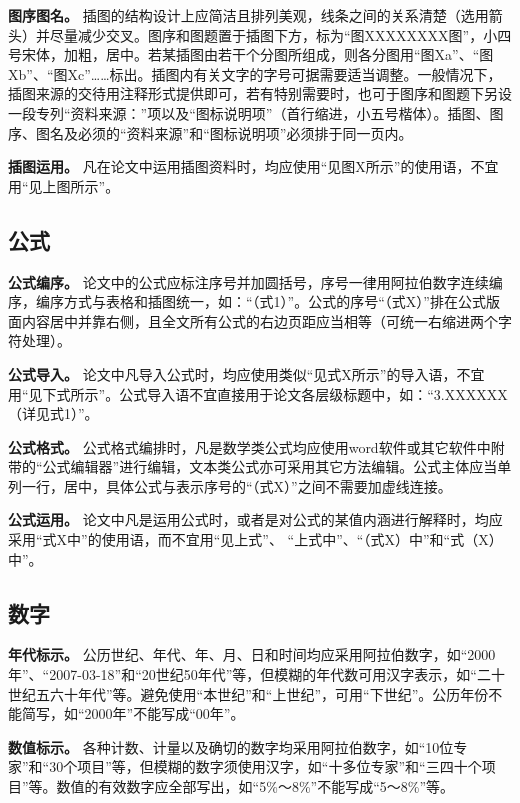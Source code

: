 \documentclass[doublesided]{Style/ucasthesis}%
\begin{document}
\textbf{图序图名。} 插图的结构设计上应简洁且排列美观，线条之间的关系清楚（选用箭头）并尽量减少交叉。图序和图题置于插图下方，标为``图XXXXXXXX图''，小四号宋体，加粗，居中。若某插图由若干个分图所组成，则各分图用``图Xa''、``图Xb''、``图Xc''\ldots{}\ldots{}标出。插图内有关文字的字号可据需要适当调整。一般情况下，插图来源的交待用注释形式提供即可，若有特别需要时，也可于图序和图题下另设一段专列``资料来源：''项以及``图标说明项''（首行缩进，小五号楷体）。插图、图序、图名及必须的``资料来源''和``图标说明项''必须排于同一页内。

\textbf{插图运用。} 凡在论文中运用插图资料时，均应使用``见图X所示''的使用语，不宜用``见上图所示''。

\hypertarget{section-28}{%
\subsection{公式}\label{section-28}}

\textbf{公式编序。} 论文中的公式应标注序号并加圆括号，序号一律用阿拉伯数字连续编序，编序方式与表格和插图统一，如：``（式1）''。公式的序号``（式X）''排在公式版面内容居中并靠右侧，且全文所有公式的右边页距应当相等（可统一右缩进两个字符处理）。

\textbf{公式导入。} 论文中凡导入公式时，均应使用类似``见式X所示''的导入语，不宜用``见下式所示''。公式导入语不宜直接用于论文各层级标题中，如：``3.XXXXXX（详见式1）''。

\textbf{公式格式。} 公式格式编排时，凡是数学类公式均应使用word软件或其它软件中附带的``公式编辑器''进行编辑，文本类公式亦可采用其它方法编辑。公式主体应当单列一行，居中，具体公式与表示序号的``（式X）''之间不需要加虚线连接。

\textbf{公式运用。} 论文中凡是运用公式时，或者是对公式的某值内涵进行解释时，均应采用``式X中''的使用语，而不宜用``见上式''、 ``上式中''、``（式X）中''和``式（X）中''。

\hypertarget{section-29}{%
\subsection{数字}\label{section-29}}

\textbf{年代标示。} 公历世纪、年代、年、月、日和时间均应采用阿拉伯数字，如``2000年''、``2007-03-18''和``20世纪50年代''等，但模糊的年代数可用汉字表示，如``二十世纪五六十年代''等。避免使用``本世纪''和``上世纪''，可用``下世纪''。公历年份不能简写，如``2000年''不能写成``00年''。

\textbf{数值标示。} 各种计数、计量以及确切的数字均采用阿拉伯数字，如``10位专家''和``30个项目''等，但模糊的数字须使用汉字，如``十多位专家''和``三四十个项目''等。数值的有效数字应全部写出，如``5\%～8\%''不能写成``5～8\%''等。
\end{document}
